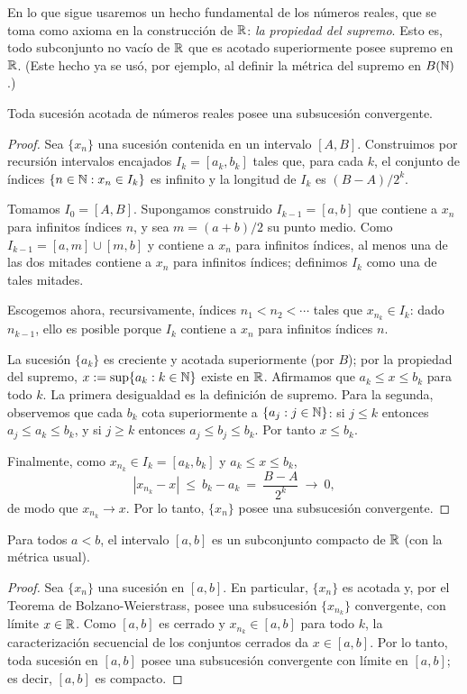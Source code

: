\begin{remark}
En lo que sigue usaremos un hecho fundamental de los números reales, que se toma como axioma en la construcción de $\mathbb{R}$: \emph{la propiedad del supremo}. Esto es, todo subconjunto no vacío de $\mathbb{R}$ que es acotado superiormente posee supremo en $\mathbb{R}$. (Este hecho ya se usó, por ejemplo, al definir la métrica del supremo en $B(\mathbb{N})$.)
\end{remark}

\begin{teorema}\label{bolzano-weierstrass}
Toda sucesión acotada de números reales posee una subsucesión convergente.
\end{teorema}
\begin{proof}
Sea $\{x_n\}$ una sucesión contenida en un intervalo $[A,B]$. Construimos por recursión intervalos encajados $I_k=[a_k,b_k]$ tales que, para cada $k$, el conjunto de índices $\{n\in\mathbb{N} : x_n\in I_k\}$ es infinito y la longitud de $I_k$ es $(B-A)/2^k$.

Tomamos $I_0=[A,B]$. Supongamos construido $I_{k-1}=[a,b]$ que contiene a $x_n$ para infinitos índices $n$, y sea $m=(a+b)/2$ su punto medio. Como $I_{k-1}=[a,m]\cup[m,b]$ y contiene a $x_n$ para infinitos índices, al menos una de las dos mitades contiene a $x_n$ para infinitos índices; definimos $I_k$ como una de tales mitades.

Escogemos ahora, recursivamente, índices $n_1<n_2<\cdots$ tales que $x_{n_k}\in I_k$: dado $n_{k-1}$, ello es posible porque $I_k$ contiene a $x_n$ para infinitos índices $n$.

La sucesión $\{a_k\}$ es creciente y acotada superiormente (por $B$); por la propiedad del supremo, $x:=\sup\{a_k : k\in\mathbb{N}\}$ existe en $\mathbb{R}$. Afirmamos que $a_k\le x\le b_k$ para todo $k$. La primera desigualdad es la definición de supremo. Para la segunda, observemos que cada $b_k$ cota superiormente a $\{a_j : j\in\mathbb{N}\}$: si $j\le k$ entonces $a_j\le a_k\le b_k$, y si $j\ge k$ entonces $a_j\le b_j\le b_k$. Por tanto $x\le b_k$.

Finalmente, como $x_{n_k}\in I_k=[a_k,b_k]$ y $a_k\le x\le b_k$,
\[
|x_{n_k}-x|\ \le\ b_k-a_k\ =\ \frac{B-A}{2^k}\ \longrightarrow\ 0,
\]
de modo que $x_{n_k}\to x$. Por lo tanto, $\{x_n\}$ posee una subsucesión convergente.
\end{proof}

\begin{corolario}\label{compacto-intervalo}
Para todos $a<b$, el intervalo $[a,b]$ es un subconjunto compacto de $\mathbb{R}$ (con la métrica usual).
\end{corolario}
\begin{proof}
Sea $\{x_n\}$ una sucesión en $[a,b]$. En particular, $\{x_n\}$ es acotada y, por el Teorema de Bolzano-Weierstrass, posee una subsucesión $\{x_{n_k}\}$ convergente, con límite $x\in\mathbb{R}$. Como $[a,b]$ es cerrado y $x_{n_k}\in[a,b]$ para todo $k$, la caracterización secuencial de los conjuntos cerrados da $x\in[a,b]$. Por lo tanto, toda sucesión en $[a,b]$ posee una subsucesión convergente con límite en $[a,b]$; es decir, $[a,b]$ es compacto.
\end{proof}

